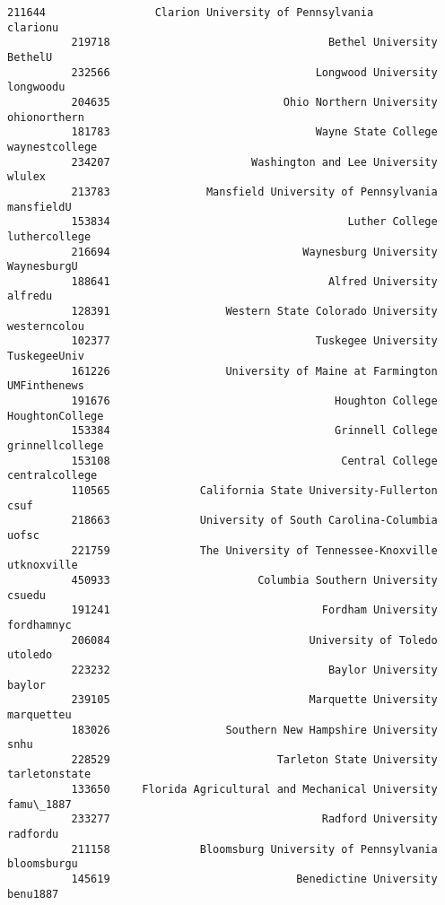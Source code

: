 \documentclass[11pt]{article}
\begin{document}
\begin{Verbatim}[commandchars=\\\{\}]
          211644                 Clarion University of Pennsylvania         clarionu   
          219718                                  Bethel University          BethelU   
          232566                                Longwood University        longwoodu   
          204635                           Ohio Northern University     ohionorthern   
          181783                                Wayne State College   waynestcollege   
          234207                      Washington and Lee University           wlulex   
          213783               Mansfield University of Pennsylvania       mansfieldU   
          153834                                     Luther College    luthercollege   
          216694                              Waynesburg University      WaynesburgU   
          188641                                  Alfred University          alfredu   
          128391                  Western State Colorado University     westerncolou   
          102377                                Tuskegee University     TuskegeeUniv   
          161226                  University of Maine at Farmington     UMFinthenews   
          191676                                   Houghton College  HoughtonCollege   
          153384                                   Grinnell College  grinnellcollege   
          153108                                    Central College   centralcollege   
          110565              California State University-Fullerton             csuf   
          218663              University of South Carolina-Columbia            uofsc   
          221759              The University of Tennessee-Knoxville      utknoxville   
          450933                       Columbia Southern University           csuedu   
          191241                                 Fordham University       fordhamnyc   
          206084                               University of Toledo          utoledo   
          223232                                  Baylor University           baylor   
          239105                               Marquette University       marquetteu   
          183026                  Southern New Hampshire University             snhu   
          228529                          Tarleton State University    tarletonstate   
          133650     Florida Agricultural and Mechanical University        famu\_1887   
          233277                                 Radford University         radfordu   
          211158              Bloomsburg University of Pennsylvania      bloomsburgu   
          145619                             Benedictine University         benu1887   

\end{Verbatim}
\end{document}
